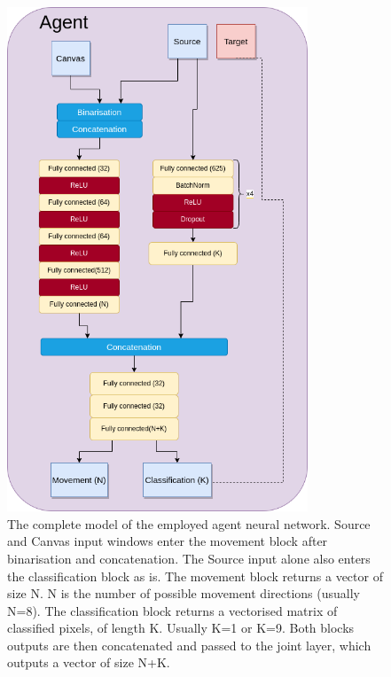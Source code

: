 \begin{figure}[ht]
  \centering
  \includegraphics[width=0.8\textwidth]{figures/chapter7/lartpc_rl_network.drawio.png}
  \caption{The complete model of the employed agent neural network. Source and Canvas input windows enter the movement block after binarisation and concatenation. The Source input alone also enters the classification block as is. The movement block returns a vector of size N. N is the number of possible movement directions (usually N=8). The classification block returns a vectorised matrix of classified pixels, of length K. Usually K=1 or K=9. Both blocks outputs are then concatenated and passed to the joint layer, which outputs a vector of size N+K.}
  \label{fig:rl_net}
\end{figure}

